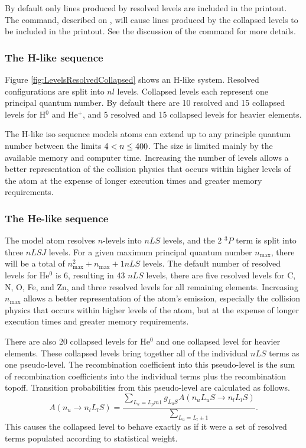 By default only lines produced by resolved levels
are included in the printout.
The  command,
described on \pageref{sec:CommandPrintLineIsoCollapsed},
will cause lines produced by the collapsed
levels to be included in the printout.
See the discussion of 
the  command for more details.

\subsubsection{The H-like sequence}
Figure \ref{fig:LevelsResolvedCollapsed} shows an H-like system.
Resolved configurations are split into $nl$ levels.
Collapsed levels each represent one principal quantum number.
By default there are 10 resolved and 15 collapsed levels for H$^0$ and He$^+$,
and 5 resolved and 15 collapsed levels for heavier elements.

The H-like iso sequence models atoms can extend up to any principle
quantum number between the limits $4 < n \le {400}$.
The size is limited mainly
by the available memory and computer time.
Increasing the
number of levels allows a better representation of the collision physics
that occurs within higher levels of the atom at the expense of longer
execution times and greater memory requirements.

\subsubsection{The He-like sequence}

The model atom resolves $n$-levels into $nLS$ levels,
and the 2 $^3P$ term is split into three $nLSJ$ levels.
For a given maximum principal quantum number
$n_{\max}$, there will be a total of $n_{\max}^2 + n_{\max} +1 nLS$ levels.  
The default number of resolved levels for He$^0$ is 6, resulting in
43 $nLS$ levels, 
there are five resolved levels
for C, N, O, Fe, and Zn, and three resolved levels
for all remaining elements.
Increasing $n_{\max}$ allows a better representation of the atom's
emission,
especially the collision physics that occurs within higher levels
of the atom,
but at the expense of longer execution times and greater memory
requirements.

There are also 20 collapsed levels for He$^0$ and one collapsed level for heavier elements.
These collapsed levels
bring together all of the individual $nLS$ terms as one pseudo-level.
The
recombination coefficient into this pseudo-level is the sum of recombination
coefficients into the individual terms plus the recombination topoff.
Transition probabilities from this pseudo-level are calculated as follows.
\begin{equation}
A(n_u \to n_lL_lS)= \frac{\sum_{L_u=L_pm 1} g_{L_{u}S} A(n_uL_uS\to
n_lL_lS)}{\sum_{L_u=L_l\pm 1}}.%
\end{equation}
This causes the collapsed level to behave exactly as if it were a set of
resolved terms populated according to statistical weight.

